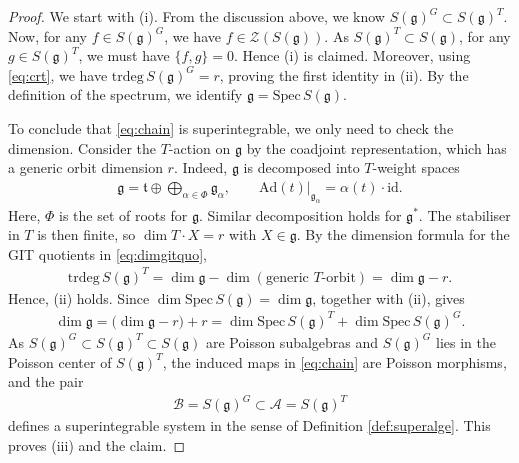 \documentclass[11pt,reqno]{amsart}
\newtheorem*{theorem A}{Main Theorem A}
\newtheorem*{theorem B}{Main Theorem B}
\newtheorem*{theorem C}{Main Theorem C}
\newtheorem*{theorem D}{Main Theorem D}
\theoremstyle{definition}
\theoremstyle{plain}
\theoremstyle{conclusion}
\begin{document}
\begin{proof}
We start with (i). From the discussion above, we know $S(\mathfrak{g})^G \subset S(\mathfrak{g})^T$. Now, for any $f \in S(\mathfrak{g})^G$, we have $f \in \mathcal{Z}(S(\mathfrak{g}))$. As $S(\mathfrak{g})^T \subset S(\mathfrak{g})$, for any $g \in S(\mathfrak{g})^T$, we must have $\{f,g\} = 0$. Hence (i) is claimed.  Moreover, using \eqref{eq:crt}, we have $\mathrm{trdeg} \, S(\mathfrak{g})^G=r$, proving the first identity in (ii). By the definition of the spectrum, we identify $\mathfrak{g} =\mathrm{Spec} \, S(\mathfrak{g})$.

To conclude that \eqref{eq:chain} is superintegrable, we only need to check the dimension.  Consider the $T$-action on $\mathfrak{g} $ by the coadjoint representation, which has a generic orbit dimension $r$. Indeed, $\mathfrak{g}$ is decomposed into $T$-weight spaces \begin{align*}
\mathfrak{g}=\mathfrak{t} \oplus\bigoplus_{\alpha\in\Phi}\mathfrak{g}_\alpha,
\qquad \left.\mathrm{Ad}(t)\right\vert_{\mathfrak{g}_\alpha}=\alpha(t)\cdot \mathrm{id}.
\end{align*}  Here, $\Phi$ is the set of roots for $\mathfrak{g}$. Similar decomposition holds for $\mathfrak{g}^*$. %
The stabiliser in $T$ is then finite, so $\dim T\cdot X=r$ with $X \in \mathfrak{g}$. By the dimension formula for the GIT quotients in \eqref{eq:dimgitquo}, \begin{align*}
\mathrm{trdeg} \, S(\mathfrak{g})^T=\dim \mathfrak{g} - \dim(\text{generic }T\text{-orbit}) =\dim\mathfrak{g} - r.
\end{align*} Hence, (ii) holds. Since $\dim\mathrm{Spec} \, S(\mathfrak{g})=\dim\mathfrak{g}$, together with (ii), gives \begin{align*}
\dim\mathfrak{g} = \bigl(\dim\mathfrak{g}-r\bigr)+r = \dim\mathrm{Spec} \, S(\mathfrak{g})^T+\dim\mathrm{Spec} \, S(\mathfrak{g})^G.
\end{align*}
As $S(\mathfrak{g})^G\subset S(\mathfrak{g})^T\subset S(\mathfrak{g})$ are Poisson subalgebras and $S(\mathfrak{g})^G$ lies in the Poisson center of $S(\mathfrak{g})^T$, the induced maps in \eqref{eq:chain} are Poisson morphisms, and the pair
\begin{align}
\mathcal{B} =S(\mathfrak{g})^G   \subset  \mathcal{A} =S(\mathfrak{g})^T
\end{align}
defines a superintegrable system in the sense of Definition \ref{def:superalge}. This proves (iii) and the claim.  
\end{proof}
\end{document}
